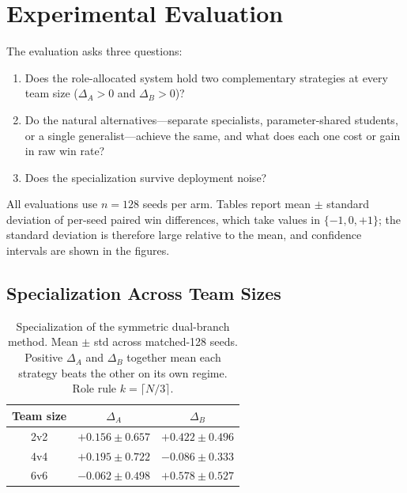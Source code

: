 
\section{Experimental Evaluation}
\label{sec:experiments}


The evaluation asks three questions:
\begin{enumerate}
  \item Does the role-allocated system hold two complementary strategies at
  every team size (\(\Delta_A>0\) and \(\Delta_B>0\))?
  \item Do the natural alternatives---separate specialists, parameter-shared
  students, or a single generalist---achieve the same, and what does each one
  cost or gain in raw win rate?
  \item Does the specialization survive deployment noise?
\end{enumerate}
All evaluations use \(n=128\) seeds per arm. Tables report mean \(\pm\)
standard deviation of per-seed paired win differences, which take values in
\(\{-1,0,+1\}\); the standard deviation is therefore large relative to the
mean, and confidence intervals are shown in the figures.

\subsection{Specialization Across Team Sizes}

\begin{table}[t]
\centering
\caption{Specialization of the symmetric dual-branch method. Mean $\pm$ std
across matched-128 seeds. Positive $\Delta_A$ and $\Delta_B$ together mean
each strategy beats the other on its own regime. Role rule
$k=\lceil N/3\rceil$.}
\label{tab:main_specialization}
\footnotesize
\setlength{\tabcolsep}{4pt}
\begin{tabular}{c|cc}
\hline
Team size & $\Delta_A$ & $\Delta_B$ \\
\hline
2v2 & $+0.156 \pm 0.657$ & $+0.422 \pm 0.496$ \\ %
4v4 & $+0.195 \pm 0.722$ & $-0.086 \pm 0.333$ \\ %
6v6 & $-0.062 \pm 0.498$ & $+0.578 \pm 0.527$ \\ %
\hline
\end{tabular}
\end{table}

